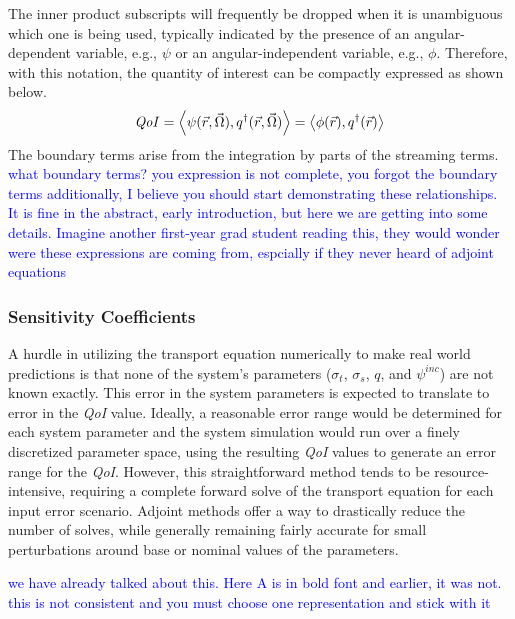 \documentclass[12pt]{report}
\newcommand{\vr}{\vec{r}}
\newcommand{\vO}{\vec{\Omega}}
\newcommand{\bra}{\left\langle}
\newcommand{\ket}{\right\rangle}
\newcommand{\sigt}{\sigma_t}
\newcommand{\sigs}{\sigma_s}
\newcommand{\angResp}{q^\dag}
\newcommand{\scalResp}{q^\dag}
\newcommand{\qoi}{{\it QoI}\xspace}
\newcommand{\comment}[2]{\marginpar{\textcolor{#2}{$\star$}}\textcolor{#2}{#1}\newline}
\newcommand{\jcr}[1]{\comment{#1}{blue}}
\newcommand{\jcr}[1]{\phantom{a}}
\begin{document}
The inner product subscripts will frequently be dropped when it is unambiguous which one is being used, typically indicated by the presence of an angular-dependent variable, e.g., $\psi$ or an angular-independent variable, e.g., $\phi$. Therefore, with this notation, the quantity of interest can be compactly expressed as shown below.
\begin{equation}
\label{QoIDef}
\qoi = \bra \psi(\vr,\vO), \angResp(\vr,\vO) \ket  = \bra \phi(\vr) , \scalResp(\vr) \ket
\end{equation}
The boundary terms arise from the integration by parts of the streaming terms.
\jcr{what boundary terms? you expression is not complete, you forgot the boundary terms}
\jcr{additionally, I believe you should start demonstrating these relationships. It is fine in the abstract, early introduction, but here we are getting into some details. Imagine another
first-year grad student reading this, they would wonder were these expressions are coming from, espcially if they never heard of adjoint equations}

\subsubsection{Sensitivity Coefficients}
A hurdle in utilizing the transport equation numerically to make real world predictions is that none of the system's parameters ($\sigt$, $\sigs$, $q$, and $\psi^{inc}$) are not known exactly. This error in the system parameters is expected to translate to error in the \qoi value. Ideally, a reasonable error range would be determined for each system parameter and the system simulation would run over a finely discretized parameter space, using the resulting \qoi values to generate an error range for the \qoi. However, this straightforward method tends to be resource-intensive, requiring a complete forward solve of the transport equation for each input error scenario. Adjoint methods offer a way to drastically reduce the number of solves, while generally remaining fairly accurate for small perturbations around base or nominal values of the parameters.

\jcr{we have already talked about this. Here A is in bold font and earlier, it was not. this is not consistent and you must choose one representation and stick with it}
\end{document}
